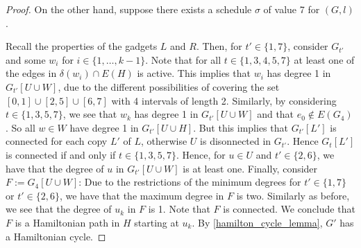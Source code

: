 \documentclass[10pt,a4paper]{article}
\numberwithin{equation}{section}
\newcommand{\set}[1]{\{ #1 \}}
\newcommand{\fromto}[2]{\set{#1, \ldots, #2}}
\begin{document}
\begin{proof}
On the other hand, suppose there exists a schedule $\sigma$ of value 7 for $(G, l)$.
  
Recall the properties of the gadgets $L$ and $R$. Then, for $t' \in \set{1, 7}$, consider $G_{t'}$ and some $w_i$ for $i \in \fromto{1}{k-1}$. Note that for all $t \in \set{1, 3, 4, 5, 7}$ at least one of the edges in $\delta(w_i) \cap E(H)$ is active. This implies that $w_i$ has degree 1 in $G_{t'}[U \cup W]$, due to the different possibilities of covering the set $[0, 1] \cup [2, 5] \cup [6, 7]$ with 4 intervals of length 2. Similarly, by considering $t \in \set{1, 3, 5, 7}$, we see that $w_k$ has degree 1 in $G_{t'}[U \cup W]$ and that $e_0 \not \in E(G_{4})$. So all $w \in W$ have degree 1 in $G_{t'}[U \cup H]$. But this implies that $G_{t'}[L']$ is connected for each copy $L'$ of $L$, otherwise $U$ is disonnected in $G_{t'}$. Hence $G_t[L']$ is connected if and only if $t \in \set{1, 3, 5, 7}$. Hence, for $u \in U$ and $t' \in \set{2, 6}$, we have that the degree of $u$ in $G_{t'}[U \cup W]$ is at least one. Finally, consider $F := G_{4}[U \cup W]$: Due to the restrictions of the minimum degrees for $t' \in \set{1, 7}$ or $t' \in \set{2, 6}$, we have that the maximum degree in $F$ is two. Similarly as before, we see that the degree of $u_k$ in $F$ is 1. Note that $F$ is connected. We conclude that $F$ is a Hamiltonian path in $H$ starting at $u_k$. By \cref{hamilton_cycle_lemma}, $G'$ has a Hamiltonian cycle.

\end{proof}
\end{document}
